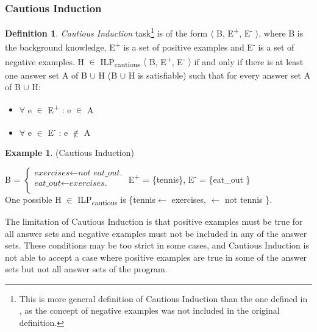 \documentclass[11pt,twoside]{report}
\theoremstyle{plain}
\theoremstyle{definition}
\newtheorem{defn}[thm]{Definition} %
\newtheorem{examp}{Example}[section]
\begin{document}
\subsubsection{Cautious Induction}

\begin{defn}
\textit{Cautious Induction} task\footnote{This is more general definition of Cautious Induction than the one defined in \cite{Sakama2009}, as the concept of negative examples was not included in the original definition.} 
is of the form $\langle$ B, E\textsuperscript{+}, E\textsuperscript{-} $\rangle$, where B is the background knowledge, E\textsuperscript{+} is a set of positive examples and E\textsuperscript{-} is a set of negative examples.
H $\in$ ILP\textsubscript{cautious} $\langle$ B, E\textsuperscript{+}, E\textsuperscript{-} $\rangle$ if and only if  there is at least one answer set A of B $\cup$ H (B $\cup$ H is satisfiable) such that for every answer set A of B $\cup$ H:
\begin{itemize}
\item $\forall$ e $\in$ E\textsuperscript{+} : e $\in$ A
\item $\forall$ e $\in$ E\textsuperscript{-} : e $\notin$ A
\end{itemize}
\end{defn}

\begin{examp} \normalfont (Cautious Induction) \\
\label{cautious_induction_example}

B = $\begin{cases}
	\textit{exercises}  \leftarrow \textit{not \ eat\_out.} \\
	\textit{eat\_out} \leftarrow \textit{exercises.} \\
      \end{cases}$
E\textsuperscript{+} = \{tennis\},      E\textsuperscript{-} = \{eat\_out \} \\

One possible  H $\in$ ILP\textsubscript{cautious} is \{tennis$ \leftarrow$ exercises, $\leftarrow$ not tennis \}.
\end{examp}

The limitation of Cautious Induction is that positive examples must be true for all answer sets and negative examples must not be included in any of the answer sets. These conditions may be too strict in some cases, and Cautious Induction is not able to accept a case where positive examples are true in some of the answer sets but not all answer sets of the program.
\end{document}
